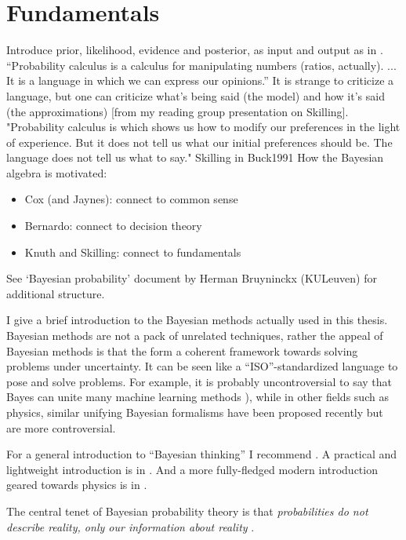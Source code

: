 \section{Fundamentals}

Introduce prior, likelihood, evidence and posterior, as input and output as in \citep{Skilling2004}.
``Probability calculus is a calculus for manipulating numbers (ratios, actually). ... It is a language in which we can express our opinions.'' \citep[p.~3]{Skilling2008}
It is strange to criticize a language, but one can criticize what's being said (the model) and how it's said (the approximations) [from my reading group presentation on Skilling].
"Probability calculus is which shows us how to modify our preferences in the light of experience. But it does not tell us what our initial preferences should be. The language does not tell us what to say." Skilling in Buck1991
How the Bayesian algebra is motivated:
\begin{itemize}
\item Cox (and Jaynes): connect to common sense
\item Bernardo: connect to decision theory
\item Knuth and Skilling: connect to fundamentals
\end{itemize}

See `Bayesian probability' document by Herman Bruyninckx (KULeuven) for additional structure.

I give a brief introduction to the Bayesian methods actually used in this thesis.
Bayesian methods are not a pack of unrelated techniques, rather the appeal of Bayesian methods is that the form a coherent framework towards solving problems under uncertainty.
It can be seen like a ``ISO''-standardized language to pose and solve problems.
For example, it is probably uncontroversial to say that Bayes can unite many machine learning methods \citep{Murphy2022}), while in other fields such as physics, similar unifying Bayesian formalisms have been proposed recently \citep{Skilling2021} but are more controversial.

For a general introduction to ``Bayesian thinking'' I recommend \cite{Jaynes2003}.
A practical and lightweight introduction is in \cite{Sivia2006}.
And a more fully-fledged modern introduction geared towards physics is in \cite{vonderLinden2014}.

The central tenet of Bayesian probability theory is that \emph{probabilities do not describe reality, only our information about reality} \citep{Jaynes1993}.


